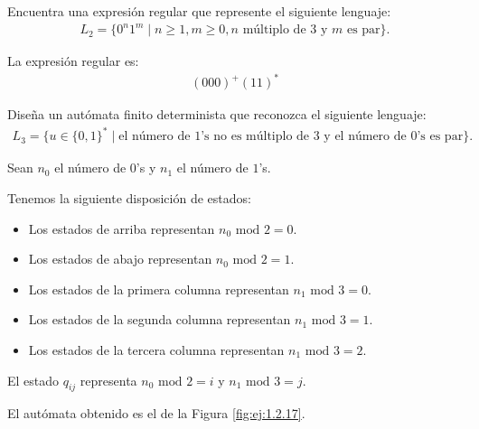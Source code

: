 \begin{ejercicio}
    Encuentra una expresión regular que represente el siguiente lenguaje:
    \begin{align*}
        L_2 = \{0^n1^m \mid n \geq 1, m \geq 0, n \text{ múltiplo de } 3 \text{ y } m \text{ es par}\}.
    \end{align*}

    La expresión regular es:
    \begin{align*}
        (000)^+(11)^*
    \end{align*}
\end{ejercicio}

\begin{ejercicio} \label{ej:1.2.17}
    Diseña un autómata finito determinista que reconozca el siguiente lenguaje:
    \begin{align*}
        L_3 = \{u \in \{0, 1\}^* \mid \text{el número de $1$'s no es múltiplo de } 3 \text{ y el número de $0$'s es par}\}.
    \end{align*}

    Sean $n_0$ el número de $0$'s y $n_1$ el número de $1$'s.

    Tenemos la siguiente disposición de estados:
    \begin{itemize}
        \item Los estados de arriba representan $n_0 \text{ mod } 2 = 0$.
        \item Los estados de abajo representan $n_0 \text{ mod } 2 = 1$.
        \item Los estados de la primera columna representan $n_1 \text{ mod } 3 = 0$.
        \item Los estados de la segunda columna representan $n_1 \text{ mod } 3 = 1$.
        \item Los estados de la tercera columna representan $n_1 \text{ mod } 3 = 2$.
    \end{itemize}

    El estado $q_{ij}$ representa $n_0 \text{ mod } 2 = i$ y $n_1 \text{ mod } 3 = j$.
    
    El autómata obtenido es el de la Figura \ref{fig:ej:1.2.17}.
    \begin{figure}
        \centering
\end{figure}
\end{ejercicio}
